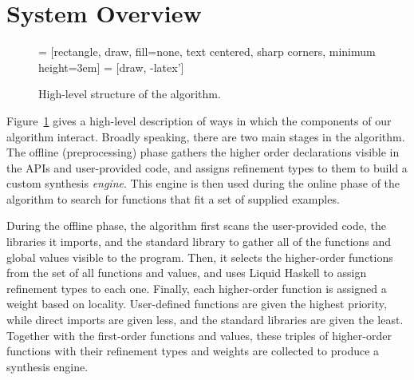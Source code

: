 \section{System Overview}



\begin{figure}[t]
  \centering
     = [rectangle, draw, fill=none, 
    text centered, sharp corners, minimum height=3em]
 = [draw, -latex']
    
  \caption{High-level structure of the algorithm.}
  \label{fig:high_level_overview}
\end{figure}

Figure~\ref{fig:high_level_overview} gives a high-level description of ways in which the components of our algorithm interact. Broadly speaking, there are two main stages in the algorithm. The offline (preprocessing) phase gathers the higher order declarations visible in the APIs and user-provided code, and assigns refinement types to them to build a custom synthesis \textit{engine}. This engine is then used during the online phase of the algorithm to search for functions that fit a set of supplied examples.

During the offline phase, the algorithm first scans the user-provided code, the libraries it imports, and the standard library to gather all of the functions and global values visible to the program. Then, it selects the higher-order functions from the set of all functions and values, and uses Liquid Haskell \cite{DBLP:conf/haskell/VazouSJ14, DBLP:conf/esop/VazouRJ13, DBLP:conf/icfp/VazouSJVJ14} to assign refinement types to each one. Finally, each higher-order function is assigned a weight based on locality\cite{DBLP:conf/pldi/GveroKKP13}. User-defined functions are given the highest priority, while direct imports are given less, and the standard libraries are given the least. Together with the first-order functions and values, these triples of higher-order functions with their refinement types and weights are collected to produce a synthesis engine.

